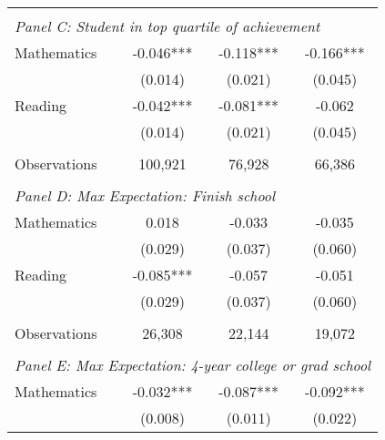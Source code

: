 {\begin{tabular}{lccc}
&  &  &   \\
\multicolumn{4}{l}{\textit{Panel C: Student in top quartile of achievement}} \\
\hspace{3mm}Mathematics&      -0.046***&      -0.118***&      -0.166***\\
                    &     (0.014)   &     (0.021)   &     (0.045)   \\
 
\hspace{3mm}Reading &      -0.042***&      -0.081***&      -0.062   \\
                    &     (0.014)   &     (0.021)   &     (0.045)   \\
                    &               &               &               \\
\hspace{3mm}Observations&     100,921   &      76,928   &      66,386   \\
 
&  &  &   \\
\multicolumn{4}{l}{\textit{Panel D: Max Expectation: Finish school}} \\
\hspace{3mm}Mathematics&       0.018   &      -0.033   &      -0.035   \\
                    &     (0.029)   &     (0.037)   &     (0.060)   \\
 
\hspace{3mm}Reading &      -0.085***&      -0.057   &      -0.051   \\
                    &     (0.029)   &     (0.037)   &     (0.060)   \\
                    &               &               &               \\
\hspace{3mm}Observations&      26,308   &      22,144   &      19,072   \\
 
&  &  &   \\
\multicolumn{4}{l}{\textit{Panel E: Max Expectation: 4-year college or grad school}} \\
\hspace{3mm}Mathematics&      -0.032***&      -0.087***&      -0.092***\\
                    &     (0.008)   &     (0.011)   &     (0.022)   \\
 

\end{tabular}}

